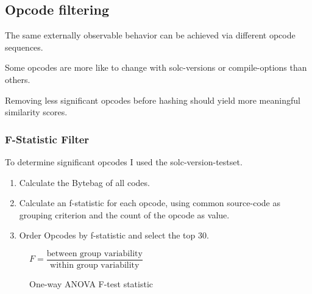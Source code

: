 \documentclass[../main.tex]{subfiles}
\begin{document}
\subsection{Opcode filtering}
The same externally observable behavior can be achieved via different opcode sequences.

Some opcodes are more like to change with solc-versions or compile-options than others.

Removing less significant opcodes before hashing should yield more meaningful similarity scores.

\subsubsection{F-Statistic Filter}
To determine significant opcodes I used the solc-version-testset\cite{solc-versions-testset}.

\begin{enumerate}
  \item Calculate the Bytebag of all codes.
  \item Calculate an f-statistic for each opcode, using common source-code as grouping criterion and the count of the opcode as value.
  \item Order Opcodes by f-statistic and select the top 30.
\end{enumerate}

\begin{figure}[h]
  \centering
  \begin{math}
    F = \dfrac{\textrm{between group variability}}{\textrm{within group variability}}
  \end{math}
  \caption{One-way ANOVA F-test statistic}
\end{figure}
\end{document}
